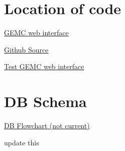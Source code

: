 


\section{Location of code}
\href{https://gemc.jlab.org/web_interface/index.php}{GEMC web interface}

\href{https://github.com/mit-mc-clas12}{Github Source}

\href{https://gemc.jlab.org/test/web_interface/index.php}{Test GEMC web interface}







\section{DB Schema}
\href{https://dbdiagram.io/d/5c9b829bf7c5bb70c72f6c34}{DB Flowchart (not current)}

update this